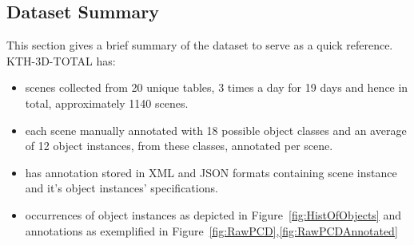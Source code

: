 \documentclass[letterpaper, 10 pt, conference]{ieeeconf}  %
\begin{document}
\subsection{Dataset Summary}
\label{ssec:Dataset Summary}
This section gives a brief summary of the dataset to serve as a quick reference.
\noindent KTH-3D-TOTAL has:
\begin{itemize}
	\item scenes collected from 20 unique tables, 3 times a day for 19 days and hence in total, approximately 1140 scenes.
	\item each scene manually annotated with 18 possible object classes and an average of 12 object instances, from these classes, annotated per scene.
	\item has annotation stored in XML and JSON formats containing scene instance and it's object instances' specifications.
	\item occurrences of object instances as depicted in Figure~\ref{fig:HistOfObjects} and annotations as exemplified in Figure~\ref{fig:RawPCD},\ref{fig:RawPCDAnnotated}
\end{itemize}
\end{document}
